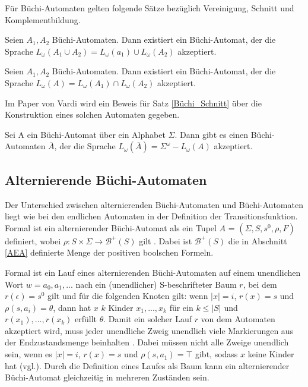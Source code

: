 Für Büchi-Automaten gelten folgende Sätze bezüglich Vereinigung, Schnitt und Komplementbildung. 

\begin{satz}\cite{choueka74, vardi+96}
\label{Büchi_Vereinigung}
Seien $A_1, A_2$ Büchi-Automaten. Dann existiert ein Büchi-Automat, der die Sprache $L_{\omega}(A_1\cup A_2)=L_{\omega}(a_1)\cup L_{\omega}(A_2)$ akzeptiert.
\end{satz}
\begin{satz}\cite{choueka74,vardi+96}
\label{Büchi_Schnitt}
Seien $A_1, A_2$ Büchi-Automaten. Dann existiert ein Büchi-Automat, der die Sprache $L_{\omega}(A)=L_{\omega}(A_1)\cap L_{\omega}(A_2)$ akzeptiert.
\end{satz}
Im Paper von Vardi \cite{vardi+96} wird ein Beweis für Satz \ref{Büchi_Schnitt} über die Konstruktion eines solchen Automaten gegeben.
\begin{satz}\cite{buechi62,vardi+96}
\label{Büchi_Komplement}
Sei A ein Büchi-Automat über ein Alphabet $\Sigma$. Dann gibt es einen Büchi-Automaten $\overline{A}$, der die Sprache $L_\omega(\overline{A})=\Sigma^\omega - L_\omega(A)$ akzeptiert.
\end{satz}

\subsection{Alternierende Büchi-Automaten}
\label{subsec:aba}
Der Unterschied zwischen alternierenden Büchi-Automaten und Büchi-Automaten liegt wie bei den endlichen Automaten in der Definition der Transitionsfunktion. Formal ist ein alternierender Büchi-Automat als ein Tupel $A$ = $(\Sigma,S,s^0,\rho,F)$ definiert, wobei $\rho : S \times \Sigma \rightarrow \mathcal{B}^+(S)$ gilt \cite{vardi+96}. Dabei ist $\mathcal{B}^+(S)$ die in Abschnitt \ref{AEA} definierte Menge der positiven boolschen Formeln.

Formal ist ein Lauf eines alternierenden Büchi-Automaten auf einem unendlichen Wort $w=a_0, a_1,...$ nach \cite{vardi+96} ein (unendlicher) S-beschrifteter Baum $r$, bei dem $r(\epsilon)=s^0$ gilt und für die folgenden Knoten gilt: wenn $|x|=i$, $r(x)=s$ und $\rho(s,a_i)=\theta$, dann hat $x$ $k$ Kinder $x_1,...,x_k$ für ein $k\leq|S|$ und ${r(x_1),...,r(x_k)}$ erfüllt $\theta$. Damit ein solcher Lauf $r$ von dem Automaten akzeptiert wird, muss jeder unendliche Zweig unendlich viele Markierungen aus der Endzustandsmenge beinhalten \cite{vardi+96}. Dabei müssen nicht alle Zweige unendlich sein, wenn es $|x|=i$, $r(x)=s$ und $\rho(s,a_1) = \top$ gibt, sodass $x$ keine Kinder hat (vgl.\cite{vardi+96}). Durch die Definition eines Laufes als Baum kann ein alternierender Büchi-Automat gleichzeitig in mehreren Zuständen sein. 


